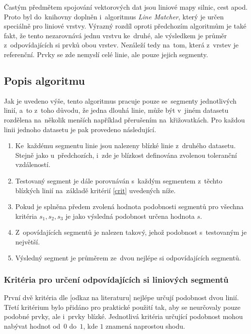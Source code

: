 Častým předmětem spojování vektorových dat jsou liniové mapy silnic, cest apod.
Proto byl do~knihovny doplněn i~algoritmus \textit{Line Matcher}, který je
určen speciálně pro liniové vrstvy. Výrazný rozdíl oproti předchozím algoritmům
je také fakt, že tento nezarovnává jednu vrstvu ke~druhé, ale výsledkem je
průměr z~odpovídajících si prvků obou vrstev. Nezáleží tedy na~tom, která 
z~vrstev je referenční. Prvky se zde nemyslí celé linie, ale pouze jejich
segmenty.

\subsection{Popis algoritmu}
\label{lm-algoritmus}

Jak je uvedeno výše, tento algoritmus pracuje pouze se~segmenty jednotlivých
linií, a~to z~toho důvodu, že jedna dlouhá linie, může být v~jiném datasetu
rozdělena na~několik menších například přerušením na~křižovatkách. Pro každou
linii jednoho datasetu je pak provedeno následující. 

\begin{enumerate}
 \item Ke~každému segmentu linie jsou nalezeny blízké linie z~druhého datasetu.
       Stejně jako u~předchozích, i~zde je blízkost definována zvolenou toleranční
       vzdáleností.
 \item Testovaný segment je dále porovnáván s~každým segmentem z~těchto blízkých
       linií na~základě kritérií \ref{crit} uvedených níže.
 \item Pokud je splněna předem zvolená hodnota podobnosti segmentů pro všechna 
       kritéria $s_1,s_2,s_3$ je jako výsledná podobnost určena hodnota $s$.
 \item Z~opovídajících segmentů je nalezen takový, jehož podobnost s~testovaným
       je největší.
 \item Výsledný segment je průměrem ze~dvou nejlépe si odpovídajících segmentů.
\end{enumerate}

\subsubsection*{Kritéria pro určení odpovídajících si liniových segmentů}
První dvě kritéria dle [odkaz na literaturu] nejlépe určují podobnost dvou %
linií. Třetí kritérium bylo přidáno pro praktické použití tak, aby se neurčovaly
pouze podobné prvky, ale i~prvky blízké. %
Jednotlivá kritéria určující podobnost mohou nabývat hodnot od~$0$ do~$1$,
kde $1$ znamená naprostou shodu.

